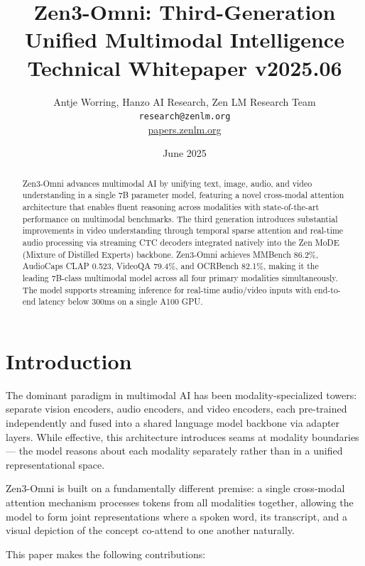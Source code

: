 \documentclass[11pt,a4paper]{article}
\title{\textbf{Zen3-Omni: Third-Generation Unified Multimodal Intelligence}\\
\large Technical Whitepaper v2025.06}
\author{Antje Worring, Hanzo AI Research, Zen LM Research Team\\
\texttt{research@zenlm.org}\\
\href{https://papers.zenlm.org}{papers.zenlm.org}}
\date{June 2025}
\begin{document}
\maketitle

\begin{abstract}
Zen3-Omni advances multimodal AI by unifying text, image, audio, and video understanding
in a single 7B parameter model, featuring a novel cross-modal attention architecture that
enables fluent reasoning across modalities with state-of-the-art performance on multimodal
benchmarks. The third generation introduces substantial improvements in video understanding
through temporal sparse attention and real-time audio processing via streaming CTC decoders
integrated natively into the Zen MoDE (Mixture of Distilled Experts) backbone. Zen3-Omni
achieves MMBench 86.2\%, AudioCaps CLAP 0.523, VideoQA 79.4\%, and OCRBench 82.1\%,
making it the leading 7B-class multimodal model across all four primary modalities
simultaneously. The model supports streaming inference for real-time audio/video inputs
with end-to-end latency below 300ms on a single A100 GPU.
\end{abstract}

\tableofcontents
\newpage

\section{Introduction}
\label{sec:intro}

The dominant paradigm in multimodal AI has been modality-specialized towers: separate
vision encoders, audio encoders, and video encoders, each pre-trained independently and
fused into a shared language model backbone via adapter layers. While effective, this
architecture introduces seams at modality boundaries --- the model reasons about each
modality separately rather than in a unified representational space.

Zen3-Omni is built on a fundamentally different premise: a single cross-modal attention
mechanism processes tokens from all modalities together, allowing the model to form
joint representations where a spoken word, its transcript, and a visual depiction of the
concept co-attend to one another naturally.

This paper makes the following contributions:
\end{document}
